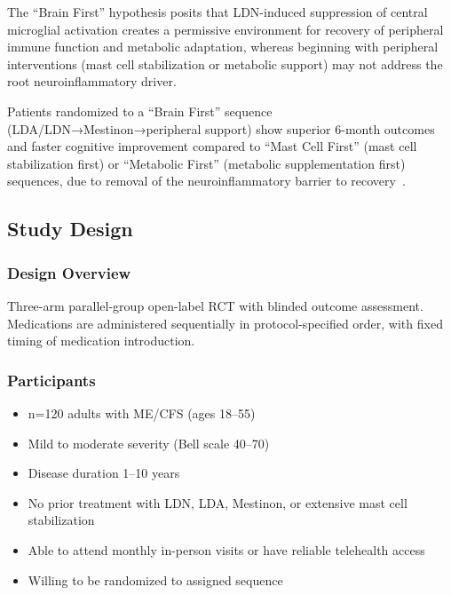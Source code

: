 The ``Brain First'' hypothesis posits that LDN-induced suppression of central microglial activation creates a permissive environment for recovery of peripheral immune function and metabolic adaptation, whereas beginning with peripheral interventions (mast cell stabilization or metabolic support) may not address the root neuroinflammatory driver.

\begin{hypothesis}
\label{hyp:brain-first-sequencing}
Patients randomized to a ``Brain First'' sequence (LDA/LDN→Mestinon→peripheral support) show superior 6-month outcomes and faster cognitive improvement compared to ``Mast Cell First'' (mast cell stabilization first) or ``Metabolic First'' (metabolic supplementation first) sequences, due to removal of the neuroinflammatory barrier to recovery~\cite{Crosby2021LDA}.
\end{hypothesis}

\subsection{Study Design}

\subsubsection{Design Overview}
Three-arm parallel-group open-label RCT with blinded outcome assessment. Medications are administered sequentially in protocol-specified order, with fixed timing of medication introduction.

\subsubsection{Participants}
\begin{itemize}
    \item n=120 adults with ME/CFS (ages 18--55)
    \item Mild to moderate severity (Bell scale 40--70)
    \item Disease duration 1--10 years
    \item No prior treatment with LDN, LDA, Mestinon, or extensive mast cell stabilization
    \item Able to attend monthly in-person visits or have reliable telehealth access
    \item Willing to be randomized to assigned sequence
\end{itemize}

